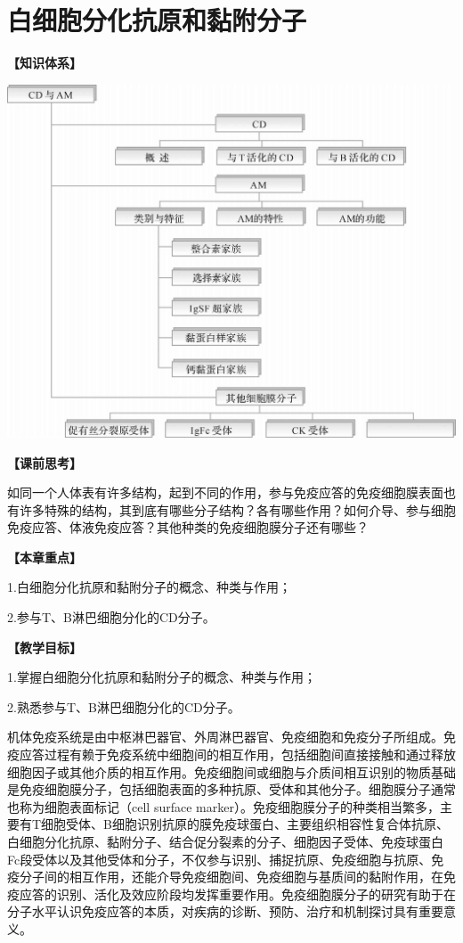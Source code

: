 \chapter{白细胞分化抗原和黏附分子}
\begin{framed}

\noindent\textbf{【知识体系】}

\begin{center}
\includegraphics[width=.6\textwidth]{./images/Image00110.jpg}
\end{center}
\noindent\textbf{【课前思考】}

如同一个人体表有许多结构，起到不同的作用，参与免疫应答的免疫细胞膜表面也有许多特殊的结构，其到底有哪些分子结构？各有哪些作用？如何介导、参与细胞免疫应答、体液免疫应答？其他种类的免疫细胞膜分子还有哪些？

\noindent\textbf{【本章重点】}

1.白细胞分化抗原和黏附分子的概念、种类与作用；

2.参与T、B淋巴细胞分化的CD分子。

\noindent\textbf{【教学目标】}

1.掌握白细胞分化抗原和黏附分子的概念、种类与作用；

2.熟悉参与T、B淋巴细胞分化的CD分子。
\end{framed}

机体免疫系统是由中枢淋巴器官、外周淋巴器官、免疫细胞和免疫分子所组成。免疫应答过程有赖于免疫系统中细胞间的相互作用，包括细胞间直接接触和通过释放细胞因子或其他介质的相互作用。免疫细胞间或细胞与介质间相互识别的物质基础是免疫细胞膜分子，包括细胞表面的多种抗原、受体和其他分子。细胞膜分子通常也称为细胞表面标记（cell
surface
marker）。免疫细胞膜分子的种类相当繁多，主要有T细胞受体、B细胞识别抗原的膜免疫球蛋白、主要组织相容性复合体抗原、白细胞分化抗原、黏附分子、结合促分裂素的分子、细胞因子受体、免疫球蛋白Fc段受体以及其他受体和分子，不仅参与识别、捕捉抗原、免疫细胞与抗原、免疫分子间的相互作用，还能介导免疫细胞间、免疫细胞与基质间的黏附作用，在免疫应答的识别、活化及效应阶段均发挥重要作用。免疫细胞膜分子的研究有助于在分子水平认识免疫应答的本质，对疾病的诊断、预防、治疗和机制探讨具有重要意义。

